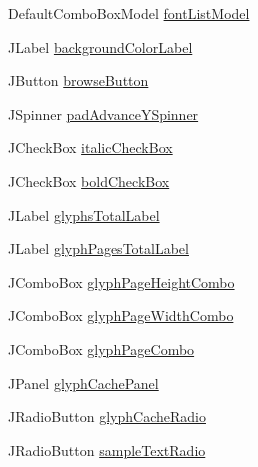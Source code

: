 \begin{DoxyCompactItemize}
\item 
Default\+Combo\+Box\+Model \mbox{\hyperlink{classorg_1_1newdawn_1_1slick_1_1tools_1_1hiero_1_1_hiero_ac28e49cac9b1a55afde4633a80c0102f}{font\+List\+Model}}
\item 
J\+Label \mbox{\hyperlink{classorg_1_1newdawn_1_1slick_1_1tools_1_1hiero_1_1_hiero_a04c540a8cc98417075e589a6aa7e0ad1}{background\+Color\+Label}}
\item 
J\+Button \mbox{\hyperlink{classorg_1_1newdawn_1_1slick_1_1tools_1_1hiero_1_1_hiero_a2a832e3532956e0f2a7fa390f9b8bc27}{browse\+Button}}
\item 
J\+Spinner \mbox{\hyperlink{classorg_1_1newdawn_1_1slick_1_1tools_1_1hiero_1_1_hiero_a5d9233b804a0a3506880e5ff43dddcad}{pad\+Advance\+Y\+Spinner}}
\item 
J\+Check\+Box \mbox{\hyperlink{classorg_1_1newdawn_1_1slick_1_1tools_1_1hiero_1_1_hiero_a4c571b425b96934d5298ae39b155db87}{italic\+Check\+Box}}
\item 
J\+Check\+Box \mbox{\hyperlink{classorg_1_1newdawn_1_1slick_1_1tools_1_1hiero_1_1_hiero_a605e35729a7fd5437c5fa9692cd44c74}{bold\+Check\+Box}}
\item 
J\+Label \mbox{\hyperlink{classorg_1_1newdawn_1_1slick_1_1tools_1_1hiero_1_1_hiero_a146359fd9b8ca84fe0282bf5958fc02e}{glyphs\+Total\+Label}}
\item 
J\+Label \mbox{\hyperlink{classorg_1_1newdawn_1_1slick_1_1tools_1_1hiero_1_1_hiero_a37a3bb42ae7db400e2f57afc462fe410}{glyph\+Pages\+Total\+Label}}
\item 
J\+Combo\+Box \mbox{\hyperlink{classorg_1_1newdawn_1_1slick_1_1tools_1_1hiero_1_1_hiero_af25be89f1cd46381e5e6fc93a02de118}{glyph\+Page\+Height\+Combo}}
\item 
J\+Combo\+Box \mbox{\hyperlink{classorg_1_1newdawn_1_1slick_1_1tools_1_1hiero_1_1_hiero_a27e8ebe1ca05ea8252bf38dc2bb73b02}{glyph\+Page\+Width\+Combo}}
\item 
J\+Combo\+Box \mbox{\hyperlink{classorg_1_1newdawn_1_1slick_1_1tools_1_1hiero_1_1_hiero_aa84207124776d8dd13b7a97ad00bb7c3}{glyph\+Page\+Combo}}
\item 
J\+Panel \mbox{\hyperlink{classorg_1_1newdawn_1_1slick_1_1tools_1_1hiero_1_1_hiero_a2a248f40f119ae31da5353e42be42662}{glyph\+Cache\+Panel}}
\item 
J\+Radio\+Button \mbox{\hyperlink{classorg_1_1newdawn_1_1slick_1_1tools_1_1hiero_1_1_hiero_a68ef2d71c04ce9de0f557b8ee106f45c}{glyph\+Cache\+Radio}}
\item 
J\+Radio\+Button \mbox{\hyperlink{classorg_1_1newdawn_1_1slick_1_1tools_1_1hiero_1_1_hiero_ab6178cf8bcd6425842e1b3fd20465e9e}{sample\+Text\+Radio}}

\end{DoxyCompactItemize}

